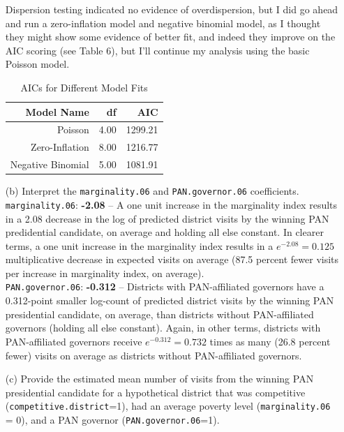 \documentclass[12pt,letterpaper]{article}
\begin{document}
\begin{enumerate}
Dispersion testing indicated no evidence of overdispersion, but I did go ahead and run a zero-inflation model and negative binomial model, as I thought they might show some evidence of better fit, and indeed they improve on the AIC scoring (see Table 6), but I'll continue my analysis using the basic Poisson model.\\

		
		

	\begin{table}[ht]
		\centering
		\label{tab6}
		\caption{AICs for Different Model Fits} 
		\begin{tabular}{rrr}
			\hline
			Model Name & df & AIC \\ 
			\hline
			Poisson & 4.00 & 1299.21 \\ 
			Zero-Inflation & 8.00 & 1216.77 \\ 
			Negative Binomial & 5.00 & 1081.91 \\ 
			\hline
		\end{tabular}
	\end{table}


	\item [(b)]
	Interpret the \texttt{marginality.06} and \texttt{PAN.governor.06} coefficients.\\
	
	 	 \texttt{marginality.06}: \textbf{-2.08} -- A one unit increase in the marginality index results in a 2.08 decrease in the log of predicted district visits by the winning PAN predidential candidate, on average and holding all else constant. In clearer terms, a one unit increase in the marginality index results in a $e^{-2.08} = 0.125$ multiplicative decrease in expected visits on average (87.5 percent fewer visits per increase in marginality index, on average). \\
	
		\texttt{PAN.governor.06}: \textbf{-0.312} -- Districts with PAN-affiliated governors have a 0.312-point smaller log-count of predicted district visits by the winning PAN presidential candidate, on average, than districts without PAN-affiliated governors (holding all else constant). Again, in other terms, districts with PAN-affiliated governors receive $e^{-0.312} = 0.732$ times as many (26.8 percent fewer) visits on average as districts without PAN-affiliated governors.
	
	
	\item [(c)]
	Provide the estimated mean number of visits from the winning PAN presidential candidate for a hypothetical district that was competitive (\texttt{competitive.district}=1), had an average poverty level (\texttt{marginality.06} = 0), and a PAN governor (\texttt{PAN.governor.06}=1).\\
	

\end{enumerate}
\end{document}
